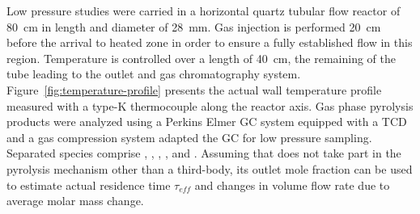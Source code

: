 \documentclass[final,3p,times,twocolumn,sort&compress]{elsarticle}
\begin{document}




Low pressure studies were carried in a horizontal quartz tubular flow reactor of \SI{80}{\centi\metre} in length and diameter of \SI{28}{\milli\metre}. Gas injection is performed \SI{20}{\centi\metre} before the arrival to heated zone in order to ensure a fully established flow in this region. Temperature is controlled over a length of \SI{40}{\centi\metre}, the remaining of the tube leading to the outlet and gas chromatography system. Figure~\ref{fig:temperature-profile} presents the actual wall temperature profile measured with a type-K thermocouple along the reactor axis. Gas phase pyrolysis products were analyzed using a Perkins Elmer GC system equipped with a TCD and a gas compression system adapted the GC for low pressure sampling. Separated species comprise , , , ,  and . Assuming that  does not take part in the pyrolysis mechanism other than a third-body, its outlet mole fraction can be used to estimate actual residence time $\tau_{eff}$ and changes in volume flow rate due to average molar mass change.
\end{document}
